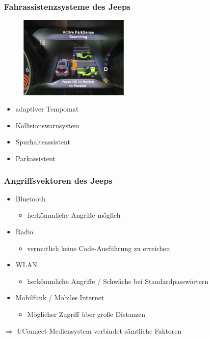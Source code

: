 \documentclass[t]{beamer}
\begin{document}
\begin{frame}
    \frametitle{Fahrassistenzsysteme des Jeeps}
    \begin{figure}
        \includegraphics[width=0.48\textwidth]{pic/jeep_parkass.png}
        \caption{}
    \end{figure}
    \begin{itemize}
        \item adaptiver Tempomat
        \item Kollisionswarnsystem
        \item Spurhalteassistent
        \item Parkassistent
    \end{itemize}
\end{frame}

\begin{frame}
	\frametitle{Angriffsvektoren des Jeeps}
    \begin{itemize}
		\item Bluetooth
        \begin{itemize}
			\item herkömmliche Angriffe möglich
		\end{itemize}

    	\item Radio
        	\begin{itemize}
				\item vermutlich keine Code-Ausführung zu erreichen
			\end{itemize}

        \item WLAN
        	\begin{itemize}
				\item herkömmliche Angriffe / Schwäche bei Standardpasswörtern
			\end{itemize}

        \item Mobilfunk / Mobiles Internet
       		\begin{itemize}
				\item Möglicher Zugriff über große Distanzen
			\end{itemize}
	\end{itemize}
    $\Rightarrow$ UConnect-Mediensystem verbindet sämtliche Faktoren
\end{frame}
\end{document}
